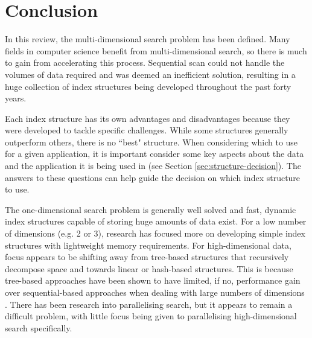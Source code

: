 \section{Conclusion}

In this review, the multi-dimensional search problem has been defined. Many fields in computer science benefit from multi-dimensional search, so there is much to gain from accelerating this process. Sequential scan could not handle the volumes of data required and was deemed an inefficient solution, resulting in a huge collection of index structures being developed throughout the past forty years.

Each index structure has its own advantages and disadvantages because they were developed to tackle specific challenges. While some structures generally outperform others, there is no ``best" structure. When considering which to use for a given application, it is important consider some key aspects about the data and the application it is being used in (see Section \ref{sec:structure-decision}). The answers to these questions can help guide the decision on which index structure to use.

The one-dimensional search problem is generally well solved and fast, dynamic index structures capable of storing huge amounts of data exist. For a low number of dimensions (e.g. 2 or 3), research has focused more on developing simple index structures with lightweight memory requirements. For high-dimensional data, focus appears to be shifting away from tree-based structures that recursively decompose space and towards linear or hash-based structures. This is because tree-based approaches have been shown to have limited, if no, performance gain over sequential-based approaches when dealing with large numbers of dimensions \cite{md-structures-samet}. There has been research into parallelising search, but it appears to remain a difficult problem, with little focus being given to parallelising high-dimensional search specifically.